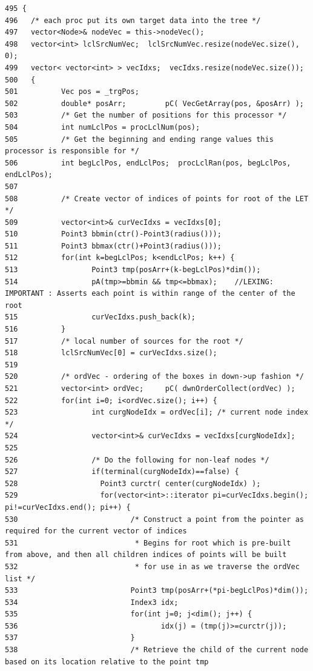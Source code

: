 \footnotesize\begin{verbatim}495 {
496   /* each proc put its own target data into the tree */
497   vector<Node>& nodeVec = this->nodeVec();
498   vector<int> lclSrcNumVec;  lclSrcNumVec.resize(nodeVec.size(), 0);
499   vector< vector<int> > vecIdxs;  vecIdxs.resize(nodeVec.size());
500   {
501          Vec pos = _trgPos;
502          double* posArr;         pC( VecGetArray(pos, &posArr) );
503          /* Get the number of positions for this processor */
504          int numLclPos = procLclNum(pos);
505          /* Get the beginning and ending range values this processor is responsible for */
506          int begLclPos, endLclPos;  procLclRan(pos, begLclPos, endLclPos);
507          
508          /* Create vector of indices of points for root of the LET */
509          vector<int>& curVecIdxs = vecIdxs[0];
510          Point3 bbmin(ctr()-Point3(radius()));
511          Point3 bbmax(ctr()+Point3(radius())); 
512          for(int k=begLclPos; k<endLclPos; k++) {
513                 Point3 tmp(posArr+(k-begLclPos)*dim());  
514                 pA(tmp>=bbmin && tmp<=bbmax);    //LEXING: IMPORTANT : Asserts each point is within range of the center of the root
515                 curVecIdxs.push_back(k);
516          }
517          /* local number of sources for the root */
518          lclSrcNumVec[0] = curVecIdxs.size();
519 
520          /* ordVec - ordering of the boxes in down->up fashion */
521          vector<int> ordVec;     pC( dwnOrderCollect(ordVec) );
522          for(int i=0; i<ordVec.size(); i++) {
523                 int curgNodeIdx = ordVec[i]; /* current node index */
524                 vector<int>& curVecIdxs = vecIdxs[curgNodeIdx];
525 
526                 /* Do the following for non-leaf nodes */
527                 if(terminal(curgNodeIdx)==false) {
528                   Point3 curctr( center(curgNodeIdx) );
529                   for(vector<int>::iterator pi=curVecIdxs.begin(); pi!=curVecIdxs.end(); pi++) {
530                          /* Construct a point from the pointer as required for the current vector of indices
531                           * Begins for root which is pre-built from above, and then all children indices of points will be built
532                           * for use in as we traverse the ordVec list */
533                          Point3 tmp(posArr+(*pi-begLclPos)*dim());
534                          Index3 idx;
535                          for(int j=0; j<dim(); j++) {
536                                 idx(j) = (tmp(j)>=curctr(j));
537                          }
538                          /* Retrieve the child of the current node based on its location relative to the point tmp

\end{verbatim}
